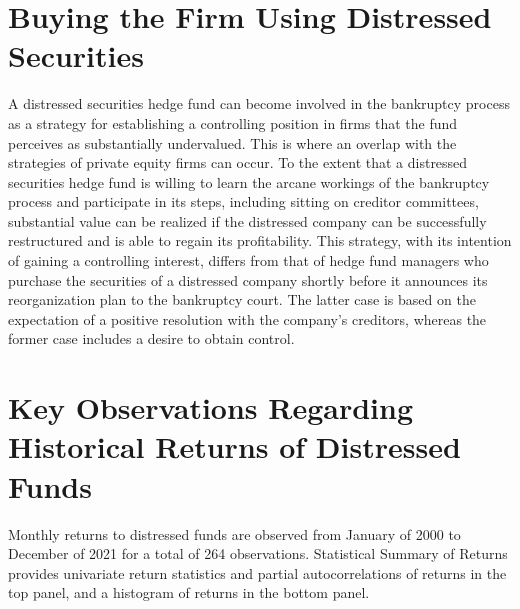 \documentclass[11pt]{article}
\begin{document}
\section*{Buying the Firm Using Distressed Securities}
A distressed securities hedge fund can become involved in the bankruptcy process as a strategy for establishing a controlling position in firms that the fund perceives as substantially undervalued. This is where an overlap with the strategies of private equity firms can occur. To the extent that a distressed securities hedge fund is willing to learn the arcane workings of the bankruptcy process and participate in its steps, including sitting on creditor committees, substantial value can be realized if the distressed company can be successfully restructured and is able to regain its profitability. This strategy, with its intention of gaining a controlling interest, differs from that of hedge fund managers who purchase the securities of a distressed company shortly before it announces its reorganization plan to the bankruptcy court. The latter case is based on the expectation of a positive resolution with the company's creditors, whereas the former case includes a desire to obtain control.

\section*{Key Observations Regarding Historical Returns of Distressed Funds}
Monthly returns to distressed funds are observed from January of 2000 to December of 2021 for a total of 264 observations. Statistical Summary of Returns provides univariate return statistics and partial autocorrelations of returns in the top panel, and a histogram of returns in the bottom panel.
\end{document}
